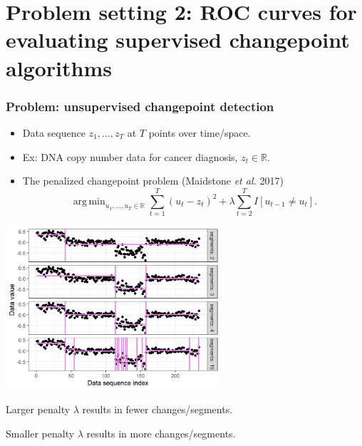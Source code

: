 \documentclass[t]{beamer}
\DeclareMathOperator*{\argmin}{arg\,min}
\begin{document}

\section{Problem setting 2: ROC curves for evaluating supervised changepoint algorithms}

\begin{frame}
  \frametitle{Problem: unsupervised changepoint detection}
  \begin{itemize}
  \item Data sequence $z_1,\dots,z_T$ at $T$ points over time/space.
  \item Ex: DNA copy number data for cancer diagnosis, $z_t\in\mathbb R$.
  \item The penalized changepoint problem (Maidstone \emph{et al.} 2017)
$$\argmin_{u_1,\dots,u_T\in\mathbb R} \sum_{t=1}^T (u_t - z_t)^2 + \lambda\sum_{t=2}^T I[u_{t-1} \neq u_t].$$
  \end{itemize}

  \parbox{0.6\textwidth}{
\includegraphics[width=0.6\textwidth]{figure-fn-not-monotonic-no-labels}
}
\parbox{0.3\textwidth}{
  Larger penalty $\lambda$ results in fewer changes/segments.

  \vskip 0.5in

  Smaller penalty $\lambda$ results in more changes/segments.
}

\end{frame}
\end{document}

